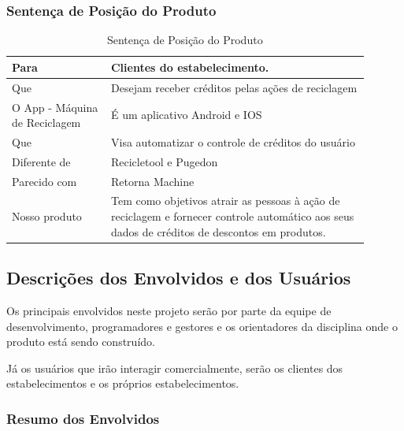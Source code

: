 \subsubsection{Sentença de Posição do Produto}

\begin{table}[htp]
    \centering
    \caption{Sentença de Posição do Produto}
    \label{my-label}
    \begin{tabular}{|p{0.25\linewidth}|p{0.65\linewidth}|}
        \hline
        Para              & Clientes do estabelecimento. \\ \hline
        Que               & Desejam receber créditos pelas ações de reciclagem  \\ \hline
        O App - Máquina de Reciclagem    & É um aplicativo Android e IOS \\ \hline
        Que & Visa automatizar o controle de créditos do usuário  \\ \hline
        Diferente de & Recicletool \cite{recicletool} e Pugedon \cite{pugedon}  \\ \hline
        Parecido com & Retorna Machine \cite{retornaMachine} \\ \hline
        Nosso produto & Tem como objetivos atrair as pessoas à ação de reciclagem e fornecer controle automático aos seus dados de créditos de descontos em produtos. \\ \hline
    \end{tabular}
\end{table}

\subsection{Descrições dos Envolvidos e dos Usuários}
Os principais envolvidos neste projeto serão por parte da equipe de desenvolvimento, programadores e gestores e os orientadores da disciplina onde o produto está sendo construído.

Já os usuários que irão interagir comercialmente, serão os clientes dos estabelecimentos e os próprios estabelecimentos.

\subsubsection{Resumo dos Envolvidos}

